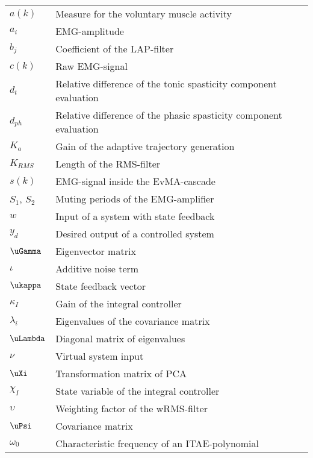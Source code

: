 \begin{longtable}[l]{ll}
$a(k)$								& Measure for the voluntary muscle activity\\
$a_i$								  & EMG-amplitude\\
$b_j$									& Coefficient of the LAP-filter\\
$c(k)$								& Raw EMG-signal\\
$d_t$									& Relative difference of the tonic spasticity component evaluation\\
$d_{ph}$							& Relative difference of the phasic spasticity component evaluation\\
$K_a$									& Gain of the adaptive trajectory generation\\
$K_{RMS}$							& Length of the RMS-filter\\
$s(k)$								& EMG-signal inside the EvMA-cascade\\
$S_1$, $S_2$					& Muting periods of the EMG-amplifier\\
$w$									  & Input of a system with state feedback\\
$y_d$									& Desired output of a controlled system\\

$\uGamma$							& Eigenvector matrix\\
$\iota$								& Additive noise term\\
$\ukappa$					    & State feedback vector\\
$\kappa_I$					  & Gain of the integral controller\\
$\lambda_i$						& Eigenvalues of the covariance matrix\\
$\uLambda$						& Diagonal matrix of eigenvalues\\
$\nu$					        & Virtual system input\\
$\uXi$								& Transformation matrix of PCA\\
$\chi_I$					    & State variable of the integral controller\\
$\upsilon$						& Weighting factor of the wRMS-filter\\
$\uPsi$								& Covariance matrix\\
$\omega_0$						& Characteristic frequency of an ITAE-polynomial\\
\end{longtable}



